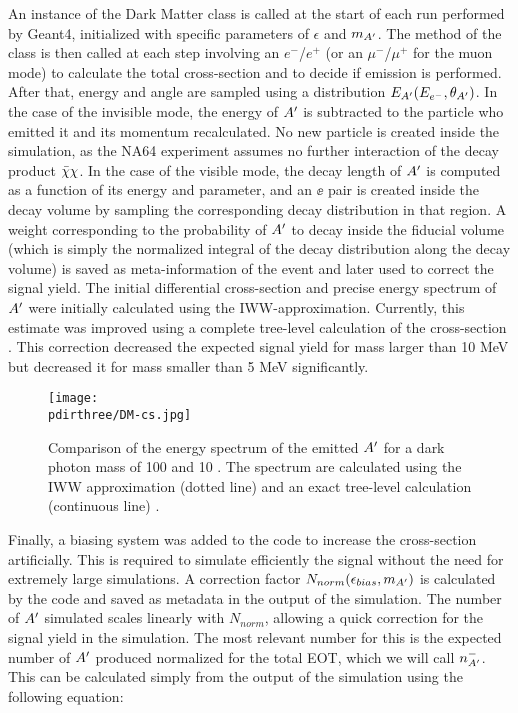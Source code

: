An instance of the Dark Matter class is called at the start of each run performed by Geant4, initialized with specific parameters of $\epsilon$ and $m_{A'}$. The method of the class is then called at each step involving an $e^-$/$e^+$ (or an $\mu^-$/$\mu^+$ for the muon mode) to calculate the total cross-section and to decide if emission is performed. After that, energy and angle are sampled using a distribution $E_{A'}(E_{e^-}, \theta_{A'})$. In the case of the invisible mode, the energy of $A'$ is subtracted to the particle who emitted it and its momentum recalculated. No new particle is created inside the simulation, as the NA64 experiment assumes no further interaction of the decay product $\bar{\chi} \chi$. In the case of the visible mode, the decay length of $A'$ is computed as a function of its energy and parameter, and an $\ee$ pair is created inside the decay volume by sampling the corresponding decay distribution in that region. A weight corresponding to the probability of $A'$ to decay inside the fiducial volume (which is simply the normalized integral of the decay distribution along the decay volume) is saved as meta-information of the event and later used to correct the signal yield.
The initial differential cross-section and precise energy spectrum of $A'$ were initially calculated using the IWW-approximation. Currently, this estimate was improved using a complete tree-level calculation of the cross-section \cite{DMsimulation}. This correction decreased the expected signal yield for mass larger than 10 MeV but decreased it for mass smaller than 5 MeV significantly.

\begin{figure}[htb!]
  \centering
  \texttt{[image: \\pdirthree/DM-cs.jpg]}
  \caption[IWW vs tree-level energy spectra]{Comparison of the energy spectrum of the emitted $A'$ for a dark photon mass of 100 \mev and 10 \mev. The spectrum are calculated using the IWW approximation (dotted line) and an exact tree-level calculation (continuous line) \cite{DMsimulation}.}
  \label{fig:dm-iww-tl}
\end{figure}


Finally, a biasing system was added to the code to increase the cross-section artificially. This is required to simulate efficiently the signal without the need for extremely large simulations. A correction factor $N_{norm}(\epsilon_{bias},m_{A'})$ is calculated by the code and saved as metadata in the output of the simulation. The number of $A'$ simulated scales linearly with $N_{norm}$, allowing a quick correction for the signal yield in the simulation. The most relevant number for this is the expected number of $A'$ produced normalized for the total EOT, which we will call $n^-_{A'}$. This can be calculated simply from the output of the simulation using the following equation:

